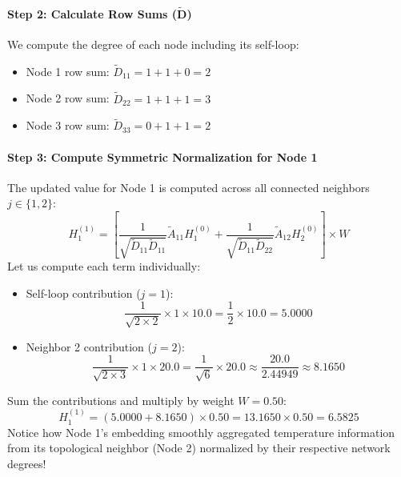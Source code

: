 \begin{example}
\paragraph{Step 2: Calculate Row Sums ($\mathbf{\tilde{D}}$)}
We compute the degree of each node including its self-loop:
\begin{itemize}
    \item Node 1 row sum: $\tilde{D}_{11} = 1 + 1 + 0 = 2$
    \item Node 2 row sum: $\tilde{D}_{22} = 1 + 1 + 1 = 3$
    \item Node 3 row sum: $\tilde{D}_{33} = 0 + 1 + 1 = 2$
\end{itemize}

\paragraph{Step 3: Compute Symmetric Normalization for Node 1}
The updated value for Node 1 is computed across all connected neighbors $j \in \{1, 2\}$:
\begin{equation*}
H_1^{(1)} = \left[ \frac{1}{\sqrt{\tilde{D}_{11}\tilde{D}_{11}}}\tilde{A}_{11} H_1^{(0)} + \frac{1}{\sqrt{\tilde{D}_{11}\tilde{D}_{22}}}\tilde{A}_{12} H_2^{(0)} \right] \times W
\end{equation*}
Let us compute each term individually:
\begin{itemize}
    \item Self-loop contribution ($j = 1$):
    \begin{equation*}
    \frac{1}{\sqrt{2 \times 2}} \times 1 \times 10.0 = \frac{1}{2} \times 10.0 = 5.0000
    \end{equation*}
    \item Neighbor 2 contribution ($j = 2$):
    \begin{equation*}
    \frac{1}{\sqrt{2 \times 3}} \times 1 \times 20.0 = \frac{1}{\sqrt{6}} \times 20.0 \approx \frac{20.0}{2.44949} \approx 8.1650
    \end{equation*}
\end{itemize}
Sum the contributions and multiply by weight $W = 0.50$:
\begin{equation*}
H_1^{(1)} = (5.0000 + 8.1650) \times 0.50 = 13.1650 \times 0.50 = \mathbf{6.5825}
\end{equation*}
Notice how Node 1's embedding smoothly aggregated temperature information from its topological neighbor (Node 2) normalized by their respective network degrees!
\end{example}

